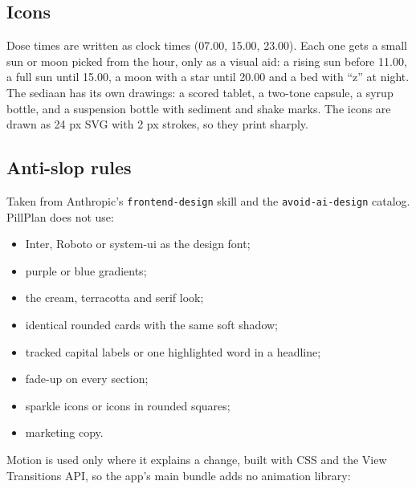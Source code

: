 \documentclass[11pt]{article}
\begin{document}
\subsection{Icons}
Dose times are written as clock times (07.00, 15.00, 23.00). Each one gets a small sun or moon picked from the hour, only as a visual aid: a rising sun before 11.00, a full sun until 15.00, a moon with a star until 20.00 and a bed with ``z'' at night. The sediaan has its own drawings: a scored tablet, a two-tone capsule, a syrup bottle, and a suspension bottle with sediment and shake marks. The icons are drawn as 24 px SVG with 2 px strokes, so they print sharply.

\subsection{Anti-slop rules}
Taken from Anthropic's \texttt{frontend-design} skill and the \texttt{avoid-ai-design} catalog. PillPlan does not use:
\begin{itemize}
  \item Inter, Roboto or system-ui as the design font;
  \item purple or blue gradients;
  \item the cream, terracotta and serif look;
  \item identical rounded cards with the same soft shadow;
  \item tracked capital labels or one highlighted word in a headline;
  \item fade-up on every section;
  \item sparkle icons or icons in rounded squares;
  \item marketing copy.
\end{itemize}
Motion is used only where it explains a change, built with CSS and the View Transitions API, so the app's main bundle adds no animation library:
\end{document}
